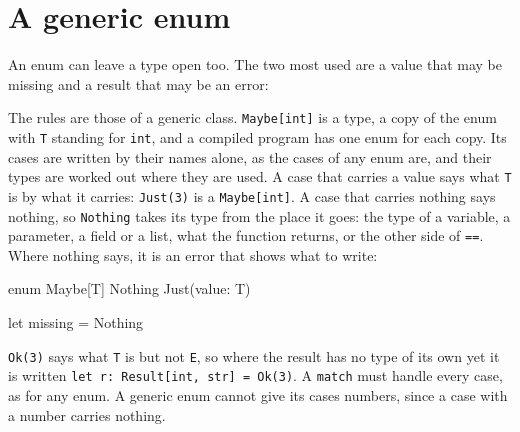 \section{A generic enum}

An enum can leave a type open too. The two most used are a value that
may be missing and a result that may be an error:


The rules are those of a generic class. \verb|Maybe[int]| is a type,
a copy of the enum with \verb|T| standing for \verb|int|, and a
compiled program has one enum for each copy. Its cases are written by
their names alone, as the cases of any enum are, and their types are
worked out where they are used. A case that carries a value says what
\verb|T| is by what it carries: \verb|Just(3)| is a
\verb|Maybe[int]|. A case that carries nothing says nothing, so
\verb|Nothing| takes its type from the place it goes: the type of a
variable, a parameter, a field or a list, what the function returns,
or the other side of \verb|==|. Where nothing says, it is an error
that shows what to write:

\begin{zeno}[fails=yes]
enum Maybe[T] {
    Nothing
    Just(value: T)
}

let missing = Nothing
\end{zeno}

\verb|Ok(3)| says what \verb|T| is but not \verb|E|, so where the
result has no type of its own yet it is written
\verb|let r: Result[int, str] = Ok(3)|. A \verb|match| must handle
every case, as for any enum. A generic enum cannot give its cases
numbers, since a case with a number carries nothing.

